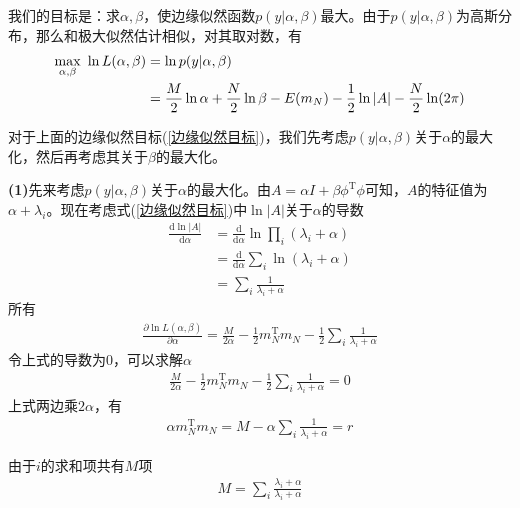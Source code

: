         \par
        我们的目标是：求$\alpha,\beta$，使边缘似然函数$p(y|\alpha,\beta)$最大。由于$p(y|\alpha,\beta)$为高斯分布，那么和极大似然估计相似，对其取对数，有
        \begin{align}
        \label{边缘似然目标}
        \max_{\alpha,\beta} \ \ln L(\alpha,\beta) &= \ln p(y|\alpha,\beta)\notag\\
        & = \frac{M}{2} \ln \alpha + \frac{N}{2} \ln \beta - E(m_N) - \frac{1}{2}\ln |A| - \frac{N}{2} \ln (2\pi)
        \end{align}
        \par
        对于上面的边缘似然目标(\ref{边缘似然目标})，我们先考虑$p(y|\alpha,\beta)$关于$\alpha$的最大化，然后再考虑其关于$\beta$的最大化。
        \par
        \textbf{(1)}先来考虑$p(y|\alpha,\beta)$关于$\alpha$的最大化。由$A = \alpha I+\beta \phi^\mathrm{T}\phi$可知，$A$的特征值为$\alpha+\lambda_i$。现在考虑式(\ref{边缘似然目标})中$\ln |A|$关于$\alpha$的导数
        \begin{align*}
        \frac{\mathrm{d} \ln |A|}{\mathrm{d}\alpha} &= \frac{\mathrm{d}}{\mathrm{d}\alpha} \ln \prod_{i} (\lambda_i + \alpha) \\
        &=\frac{\mathrm{d}}{\mathrm{d}\alpha}\sum_i \ln (\lambda_i+\alpha)\\
        &=\sum_i \frac{1}{\lambda_i + \alpha}
        \end{align*}
        所有
        \begin{align*}
        \frac{\partial \ln L(\alpha,\beta)}{\partial \alpha} = \frac{M}{2\alpha} - \frac{1}{2}m_N ^{\mathrm{T}} m_N - \frac{1}{2} \sum_i \frac{1}{\lambda_i + \alpha}
        \end{align*}
        令上式的导数为0，可以求解$\alpha$
        \begin{align*}
        \frac{M}{2\alpha} - \frac{1}{2}m_N ^{\mathrm{T}} m_N - \frac{1}{2} \sum_i \frac{1}{\lambda_i + \alpha} = 0
        \end{align*}
        上式两边乘$2\alpha$，有
        \begin{align*}
        \alpha m_N^\mathrm{T} m_N = M - \alpha \sum_i \frac{1}{\lambda_i + \alpha} = r
        \end{align*}
        \par
        由于$i$的求和项共有$M$项
        \begin{align*}
        M = \sum_i \frac{\lambda_i+\alpha}{\lambda_i+\alpha}
        \end{align*}
